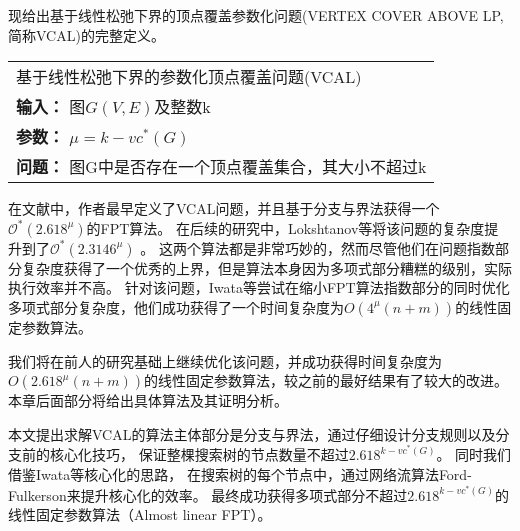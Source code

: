 现给出基于线性松弛下界的顶点覆盖参数化问题(VERTEX COVER ABOVE LP, 简称VCAL)的完整定义。\\

\begin{tabular}{| p{0.9\headwidth} |}
  \hline
  基于线性松弛下界的参数化顶点覆盖问题(VCAL) \\
  \textbf{输入：} 图$G(V, E)$及整数k \\
  \textbf{参数：} $\mu = k - vc^*(G)$\\
  \textbf{问题：} 图G中是否存在一个顶点覆盖集合，其大小不超过k\\
  \hline
\end{tabular} \vspace{0.5cm}


在文献\cite{narayanaswamy2012lp}中，作者最早定义了VCAL问题，并且基于分支与界法获得一个$\mathcal{O}^*(2.618^{\mu})$的FPT算法。
在后续的研究中，Lokshtanov等将该问题的复杂度提升到了$\mathcal{O}^*(2.3146^{\mu})$ 。
这两个算法都是非常巧妙的，然而尽管他们在问题指数部分复杂度获得了一个优秀的上界，但是算法本身因为多项式部分糟糕的级别，实际执行效率并不高。
针对该问题，Iwata等尝试在缩小FPT算法指数部分的同时优化多项式部分复杂度，他们成功获得了一个时间复杂度为$O(4^{\mu}(n+m))$的线性固定参数算法。

我们将在前人的研究基础上继续优化该问题，并成功获得时间复杂度为$O(2.618^{\mu}(n+m))$的线性固定参数算法，较之前的最好结果有了较大的改进。
本章后面部分将给出具体算法及其证明分析。

本文提出求解VCAL的算法主体部分是分支与界法，通过仔细设计分支规则以及分支前的核心化技巧，
保证整棵搜索树的节点数量不超过$2.618^{k-vc^*(G)}$。
同时我们借鉴Iwata等核心化的思路，
在搜索树的每个节点中，通过网络流算法Ford-Fulkerson来提升核心化的效率。
最终成功获得多项式部分不超过$2.618^{k-vc^*(G)}$的线性固定参数算法（Almost linear FPT）。
